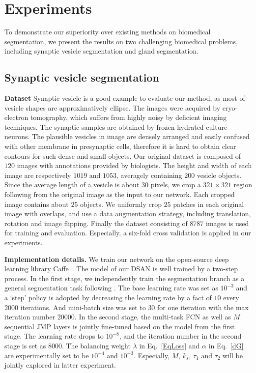 \section{Experiments}
\label{sec:results}
To demonstrate our superiority over existing methods on biomedical segmentation, we present the results on two challenging biomedical problems, including synaptic vesicle segmentation and gland segmentation.

\subsection{Synaptic vesicle segmentation}
\noindent\textbf{Dataset}
Synaptic vesicle is a good example to evaluate our method, as most of vesicle shapes are approximatively ellipse.
The images were acquired by cryo-electron tomography, which suffers from highly noisy by deficient imaging techniques.
The synaptic samples are obtained by frozen-hydrated culture neurons.
The plausible vesicles in image are densely arranged and easily confused with other membrane in presynaptic cells, therefore it is hard to obtain clear contours for such dense and small objects.
Our original dataset is composed of $120$ images with annotations provided by biologists.
The height and width of each image are respectively $1019$ and $1053$, averagely containing $200$ vesicle objects.
Since the average length of a vesicle is about $30$ pixels, we crop a $321\times 321$ region following \cite{Chen2014a} from the original image as the input to our network. 
Each cropped image contains about $25$ objects.
We uniformly crop $25$ patches in each original image with overlaps, and use a data augmentation strategy, including translation, rotation and image flipping.
Finally the dataset consisting of $8787$ images is used for training and evaluation.
Especially, a six-fold cross validation is applied in our experiments.

\noindent\textbf{Implementation details.}
We train our network on the open-source deep learning library Caffe~\cite{Jia2014}.
The model of our DSAN is well trained by a two-step process.
In the first stage, we independently train the segmentation branch as a general segmentation task following \cite{Chen2014a}.
The base learning rate was set as $10^{-3}$ and a `step' policy is adopted by decreasing the learning rate by a fact of $10$ every $2000$ iterations.
And mini-batch size was set to $30$ for one iteration with the max iteration number $20000$.
In the second stage, the multi-task FCN as well as $M$ sequential JMP layers is jointly fine-tuned based on the model from the first stage.
The learning rate drops to $10^{-8}$, and the iteration number in the second stage is set as $8000$.
The balancing weight $\lambda$ in Eq.~\ref{EqLoss} and $\alpha$ in Eq.~\ref{dG} are experimentally set to be $10^{-4}$ and $10^{-3}$.
Especially, $M$, $k_s$, $\tau_1$ and $\tau_2$ will be jointly explored in latter experiment.

